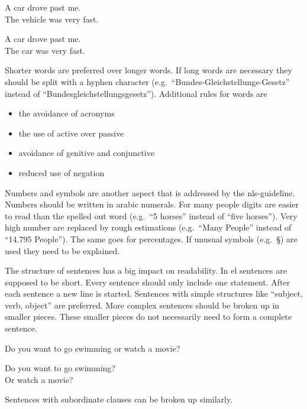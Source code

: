 \begin{center}
    \colorbox{red!20}{
        \begin{minipage}{0.6\textwidth}
           A car drove past me.\\
           The vehicle was very fast.
        \end{minipage}
    }
    \colorbox{green!20}{
        \begin{minipage}{0.6\textwidth}
            A car drove past me.\\
            The car was very fast.
        \end{minipage}
    }
\end{center}
Shorter words are preferred over longer words.
If long words are necessary they should be split with a hyphen character (e.g.\ \enquote{Bundes-Gleichstellungs-Gesetz} instead of \enquote{Bundesgleichstellungsgesetz}).
Additional rules for words are
\begin{itemize}[noitemsep]
    \item the avoidance of acronyms
    \item the use of active over passive
    \item avoidance of genitive and conjunctive
    \item reduced use of negation
\end{itemize}
Numbers and symbols are another aspect that is addressed by the \gls{nls}-guideline.
Numbers should be written in arabic numerals.
For many people digits are easier to read than the spelled out word (e.g.\ \enquote{5 horses} instead of \enquote{five horses}).
Very high number are replaced by rough estimations (e.g.\ \enquote{Many People} instead of \enquote{14.795 People}).
The same goes for percentages.
If unusual symbols (e.g.\ §) are used they need to be explained.

The structure of sentences has a big impact on readability. %
In \gls{el} sentences are supposed to be short.
Every sentence should only include one statement.
After each sentence a new line is started.
Sentences with simple structures like \enquote{subject, verb, object} are preferred.
More complex sentences should be broken up in smaller pieces.
These smaller pieces do not necessarily need to form a complete sentence.
\begin{center}
    \colorbox{red!20}{
        \begin{minipage}{0.6\textwidth}
            Do you want to go swimming or watch a movie?
        \end{minipage}
    }
    \colorbox{green!20}{
        \begin{minipage}{0.6\textwidth}
            Do you want to go swimming? \\
            Or watch a movie?
        \end{minipage}
    }
\end{center}
Sentences with subordinate clauses can be broken up similarly.

